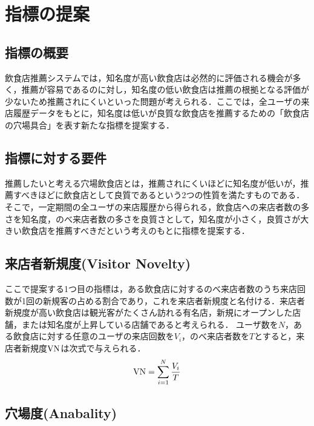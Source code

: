 \chapter{指標の提案}
\label{chap:proposal}

\section{指標の概要}

飲食店推薦システムでは，知名度が高い飲食店は必然的に評価される機会が多く，推薦が容易であるのに対し，知名度の低い飲食店は推薦の根拠となる評価が少ないため推薦されにくいといった問題が考えられる．ここでは，全ユーザの来店履歴データをもとに，知名度は低いが良質な飲食店を推薦するための「飲食店の穴場具合」を表す新たな指標を提案する．

\section{指標に対する要件}

推薦したいと考える穴場飲食店とは，推薦されにくいほどに知名度が低いが，推薦すべきほどに飲食店として良質であるという2つの性質を満たすものである．
そこで，一定期間の全ユーザの来店履歴から得られる，飲食店への来店者数の多さを知名度，のべ来店者数の多さを良質さとして，知名度が小さく，良質さが大きい飲食店を推薦すべきだという考えのもとに指標を提案する．

\section{来店者新規度(Visitor Novelty)}

ここで提案する1つ目の指標は，ある飲食店に対するのべ来店者数のうち来店回数が1回の新規客の占める割合であり，これを来店者新規度と名付ける．来店者新規度が高い飲食店は観光客がたくさん訪れる有名店，新規にオープンした店舗，または知名度が上昇している店舗であると考えられる．
ユーザ数を$N$，ある飲食店に対する任意のユーザの来店回数を$V_i$，のべ来店者数を$T$とすると，来店者新規度$\rm VN$は次式で与えられる．
\begin{equation}
	{\rm VN} = \sum^{N}_{i=1} \frac{V_i}{T}
\end{equation}

\section{穴場度(Anabality)}


